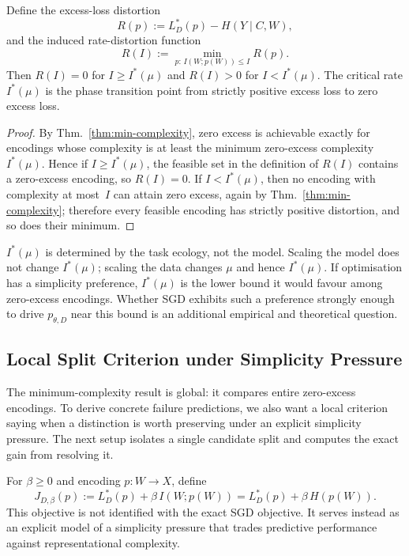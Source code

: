 \documentclass[twoside,11pt]{article}
\newcommand{\thmref}[1]{Thm.~\ref{#1}}
\begin{document}
\begin{corollary}
Define the excess-loss distortion
\[
R(p) := L_D^*(p) - H(Y \mid C,W),
\]
and the induced rate-distortion function
\[
R(I) := \min_{p:\, I(W;p(W)) \le I} R(p).
\]
Then $R(I) = 0$ for $I \ge I^*(\mu)$ and $R(I) > 0$ for $I < I^*(\mu)$. The critical rate $I^*(\mu)$ is the phase transition point from strictly positive excess loss to zero excess loss.
\end{corollary}

\begin{proof}
By \thmref{thm:min-complexity}, zero excess is achievable exactly for encodings whose complexity is at least the minimum zero-excess complexity~$I^*(\mu)$. Hence if $I\ge I^*(\mu)$, the feasible set in the definition of $R(I)$ contains a zero-excess encoding, so $R(I)=0$. If $I<I^*(\mu)$, then no encoding with complexity at most~$I$ can attain zero excess, again by \thmref{thm:min-complexity}; therefore every feasible encoding has strictly positive distortion, and so does their minimum.
\end{proof}

$I^*(\mu)$ is determined by the task ecology, not the model. Scaling the model does not change $I^*(\mu)$; scaling the data changes $\mu$ and hence $I^*(\mu)$. If optimisation has a simplicity preference, $I^*(\mu)$ is the lower bound it would favour among zero-excess encodings. Whether SGD exhibits such a preference strongly enough to drive $p_{\theta,D}$ near this bound is an additional empirical and theoretical question.

\subsection{Local Split Criterion under Simplicity Pressure}

The minimum-complexity result is global: it compares entire zero-excess encodings. To derive concrete failure predictions, we also want a local criterion saying when a distinction is worth preserving under an explicit simplicity pressure. The next setup isolates a single candidate split and computes the exact gain from resolving it.

\begin{definition}\label{def:regularized-objective}
For $\beta \ge 0$ and encoding $p \colon W \to X$, define
\[
J_{D,\beta}(p) := L_D^*(p) + \beta\, I(W; p(W))
            = L_D^*(p) + \beta\, H(p(W)).
\]
This objective is not identified with the exact SGD objective. It serves instead as an explicit model of a simplicity pressure that trades predictive performance against representational complexity.
\end{definition}
\end{document}
